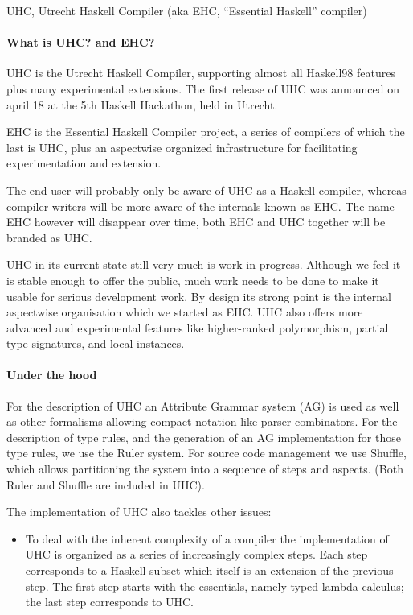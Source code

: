 \begin{hcarentry}{UHC, Utrecht Haskell Compiler (aka EHC, ``Essential Haskell'' compiler)}
\label{uhc}
\label{ehc}
\makeheader

\paragraph{What is UHC? and EHC?}
UHC is the Utrecht Haskell Compiler, supporting almost all Haskell98 features plus many
experimental extensions.
The first release of UHC was announced on april 18 at the 5th Haskell Hackathon, held in Utrecht.

EHC is the Essential Haskell Compiler project, a series of compilers of which the last is UHC, plus 
an aspectwise organized infrastructure for facilitating experimentation and extension.

The end-user will probably only be aware of UHC as a Haskell compiler,
whereas compiler writers will be more
aware of the internals known as EHC.
The name EHC however will disappear over time, both EHC and UHC together will be branded as UHC.

UHC in its current state still very much is work in progress.
Although we feel it is stable enough to offer the public,
much work needs to be done to make it usable for serious development work.
By design its strong point is the internal aspectwise organisation which we started as EHC.
UHC also offers more advanced and experimental features like higher-ranked polymorphism, partial type signatures,
and local instances.

\paragraph{Under the hood}

For the description of UHC an Attribute Grammar system (AG) is used as well as other
formalisms allowing compact notation like parser combinators.  For the
description of type rules, and the generation of an AG implementation for
those type rules, we use the Ruler system.
For source code management we use Shuffle, which allows partitioning the system into a sequence of steps and aspects.
(Both Ruler and Shuffle are included in UHC).

The implementation of UHC also tackles other issues:
\begin{itemize}
\item
   To deal with the inherent complexity of a compiler the implementation of UHC is organized as a series of
   increasingly complex steps.
   Each step corresponds to a Haskell subset which itself is an extension
   of the previous step.
   The first step starts with the essentials, namely typed lambda
   calculus; the last step corresponds to UHC.


\end{itemize}
\end{hcarentry}
